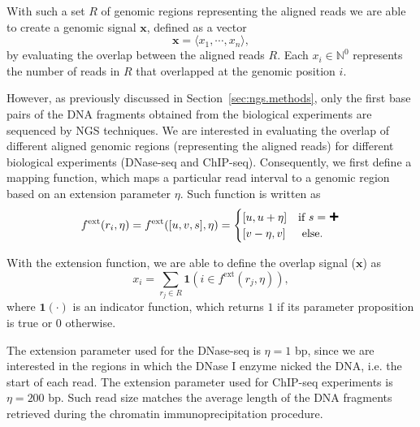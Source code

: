 With such a set $R$ of genomic regions representing the aligned reads we are able to create a genomic signal $\mathbf{x}$, defined as a vector
\begin{equation}
  \label{eq:raw.signal}
  \mathbf{x} = \langle {x}_{1}, \cdots, {x}_{n} \rangle,
\end{equation}
by evaluating the overlap between the aligned reads $R$. Each $x_i \in {\mathbb{N}}^{0}$ represents the number of reads in $R$ that overlapped at the genomic position $i$.

However, as previously discussed in Section~\ref{sec:ngs.methods}, only the first base pairs of the DNA fragments obtained from the biological experiments are sequenced by NGS techniques. We are interested in evaluating the overlap of different aligned genomic regions (representing the aligned reads) for different biological experiments (DNase-seq and ChIP-seq). Consequently, we first define a mapping function, which maps a particular read interval to a genomic region based on an extension parameter $\eta$. Such function is written as
\begin{equation}
  \label{eq:raw.signal.extension}
  {f}^{\text{ext}}({r}_{i}, \eta) = {f}^{\text{ext}}([u, v, s], \eta) =
  \begin{cases}
    [u,u+\eta] & \text{if } s = \Plus \\
    [v-\eta,v] & \text{ else.}
  \end{cases}
\end{equation}

With the extension function, we are able to define the overlap signal ($\mathbf{x}$) as
\begin{equation}
  \label{eq:raw.signal.overlap}
  {x}_{i} = \sum_{{r}_{j} \in R} \mathbf{1}\left( i \in {f}^{\text{ext}}({r}_{j}, \eta) \right),
\end{equation}
where ${\mathbf{1}}(\cdot)$ is an indicator function, which returns $1$ if its parameter proposition is true or $0$ otherwise.

The extension parameter used for the DNase-seq is $\eta = 1$ bp, since we are interested in the regions in which the DNase I enzyme nicked the DNA, i.e. the start of each read. The extension parameter used for ChIP-seq experiments is $\eta = 200$ bp. Such read size matches the average length of the DNA fragments retrieved during the chromatin immunoprecipitation procedure.

